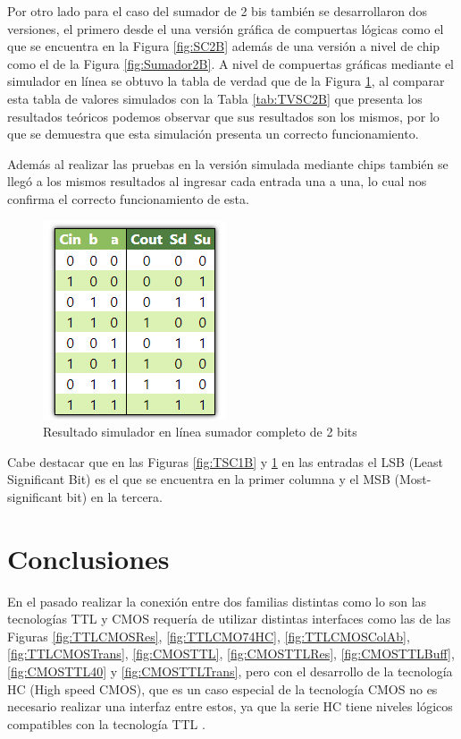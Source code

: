\documentclass[journal]{IEEEtran}
\begin{document}
	Por otro lado para el caso del sumador de 2 bis también se desarrollaron dos versiones, el primero desde el una versión gráfica de compuertas lógicas como el que se encuentra en la Figura \ref{fig:SC2B} además de una versión a nivel de chip como el de la Figura \ref{fig:Sumador2B}. A nivel de compuertas gráficas mediante el simulador en línea se obtuvo la tabla de verdad que de la Figura \ref{fig:TSC2B}, al comparar esta tabla de valores simulados con la Tabla \ref{tab:TVSC2B} que presenta los resultados teóricos podemos observar que sus resultados son los mismos, por lo que se demuestra que esta simulación presenta un correcto funcionamiento.
	
	Además al realizar las pruebas en la versión simulada mediante chips también se llegó a los mismos resultados al ingresar cada entrada una a una, lo cual nos confirma el correcto funcionamiento de esta.
	
	\begin{figure}[htb]
		\centering
		\includegraphics[scale = 0.7]{img/TSC2B.png}
		\caption{Resultado simulador en línea sumador completo de 2 bits}
		\label{fig:TSC2B}
	\end{figure}
	
	Cabe destacar que en las Figuras \ref{fig:TSC1B} y \ref{fig:TSC2B} en las entradas el LSB (Least Significant Bit) es el que se encuentra en la primer columna y el MSB (Most-significant bit) en la tercera.
	
	\section{Conclusiones}
	
	En el pasado realizar la conexión entre dos familias distintas como lo son las tecnologías TTL y CMOS requería de utilizar distintas interfaces como las de las Figuras \ref{fig:TTLCMOSRes}, \ref{fig:TTLCMO74HC}, \ref{fig:TTLCMOSColAb}, \ref{fig:TTLCMOSTrans}, \ref{fig:CMOSTTL}, \ref{fig:CMOSTTLRes}, \ref{fig:CMOSTTLBuff}, \ref{fig:CMOSTTL40} y \ref{fig:CMOSTTLTrans}, pero con el desarrollo de la tecnología HC (High speed CMOS), que es un caso especial de la tecnología CMOS no es necesario realizar una interfaz entre estos, ya que la serie HC tiene niveles lógicos compatibles con la tecnología TTL \cite{Unicrom}.
	
\end{document}
